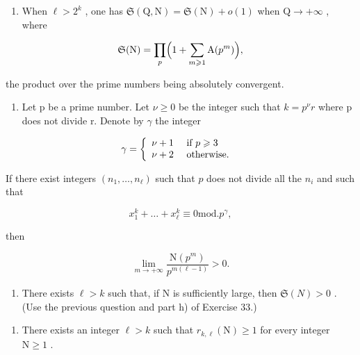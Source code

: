 \begin{enumerate}
\def\labelenumi{\alph{enumi})}
\setcounter{enumi}{6}
\tightlist
\item
  When \(\ell > 2^k\) , one has \(\mathfrak{S}(\mathrm{Q}, \mathrm{N}) = \mathfrak{S}(\mathrm{N}) + o(1)\) when \(\mathrm{Q} \to +\infty\) , where
\end{enumerate}

\[
\mathfrak {S} (\mathrm{N}) = \prod_ {p} \Bigl (1 + \sum_ {m \geqslant 1} \mathrm{A} (p ^ {m}) \Bigr),
\]

the product over the prime numbers being absolutely convergent.

\begin{enumerate}
\def\labelenumi{\alph{enumi})}
\setcounter{enumi}{7}
\tightlist
\item
  Let p be a prime number. Let \(\nu \geqslant 0\) be the integer such that \(k = p^{\nu}r\) where p does not divide r. Denote by \(\gamma\) the integer
\end{enumerate}

\[
\gamma = \left\{ \begin{array}{l l} \nu + 1 & \text { if } p \geqslant 3 \\ \nu + 2 & \text { otherwise. } \end{array} \right.
\]

If there exist integers \((n_1, \ldots, n_\ell)\) such that \(p\) does not divide all the \(n_i\) and such that

\[
x _ {1} ^ {k} + \dots + x _ {\ell} ^ {k} \equiv 0 \mathrm{mod.} p ^ {\gamma},
\]

then

\[
\lim _ {m \to + \infty} \frac {\mathrm{N} (p ^ {m})}{p ^ {m (\ell - 1)}} > 0.
\]

\begin{enumerate}
\def\labelenumi{\roman{enumi})}
\tightlist
\item
  There exists \(\ell > k\) such that, if N is sufficiently large, then \(\mathfrak{S}(N) > 0\) . (Use the previous question and part h) of Exercise 33.)
\end{enumerate}

\begin{enumerate}
\def\labelenumi{\alph{enumi})}
\setcounter{enumi}{9}
\tightlist
\item
  There exists an integer \(\ell > k\) such that \(r_{k,\ell}(\mathrm{N}) \geqslant 1\) for every integer \(\mathrm{N} \geqslant 1\) .
\end{enumerate}

